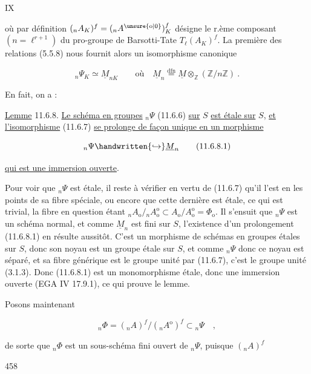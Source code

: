 
\hfill IX

où par définition $({}_nA_K)^f=({}_nA^{\unsure{\mathrm{o}|0}})^f_K$ désigne le r.ème composant $(n=\ell^{r+1})$ du pro-groupe de Barsotti-Tate $T_\ell(A_K)^f$. La première des relations (5.5.8) nous fournit alors un isomorphisme canonique

\[
{}_n\Psi_K\simeq\underline{M}_{nK}\qquad\text{où}\quad\underline{M}_n\overset{\mathrm{dfn}}{=}\underline{M}\otimes_{\mathbb{Z}}(\mathbb{Z}/n\mathbb{Z})\ .\tag*{(11.6.7)}
\]

En fait, on a :

\uline{Lemme} 11.6.8. \uline{Le schéma en groupes} $ {}_n\Psi$ (11.6.6) \uline{sur} $S$ \uline{est étale sur} $S$, \uline{et l'isomorphisme} (11.6.7) \uline{se prolonge de façon unique en un morphisme}

\[
{}_n\Psi\handwritten{\hookrightarrow}\underline{M}_n\tag*{(11.6.8.1)}
\]

\uline{qui est une immersion ouverte}.

Pour voir que $ {}_n\Psi$ est étale, il reste à vérifier en vertu de (11.6.7) qu'il l'est en les points de sa fibre spéciale, ou encore que cette dernière est étale, ce qui est trivial, la fibre en question étant $ {}_nA_{\mathrm{o}}/{}_nA_{\mathrm{o}}^{\mathrm{o}}\subset A_{\mathrm{o}}/A_{\mathrm{o}}^{\mathrm{o}}=\Phi_{\mathrm{o}}$. Il s'ensuit que $ {}_n\Psi$ est un schéma normal, et comme $\underline{M}_n$ est fini sur $S$, l'existence d'un prolongement (11.6.8.1) en résulte aussitôt. C'est un morphisme de schémas en groupes étales sur $S$, donc son noyau est un groupe étale sur $S$, et comme $ {}_n\Psi$ donc ce noyau est séparé, et sa fibre générique est le groupe unité par (11.6.7), c'est le groupe unité (3.1.3). Donc (11.6.8.1) est un monomorphisme étale, donc une immersion ouverte (EGA IV 17.9.1), ce qui prouve le lemme.

Posons maintenant

\[
{}_n\Phi=({}_nA)^f/({}_nA^{\mathrm{o}})^f\subset{}_n\Psi\quad,\tag*{(11.6.9)}
\]

de sorte que $ {}_n\Phi$ est un sous-schéma fini ouvert de $ {}_n\Psi$, puisque $({}_nA)^f$


458

